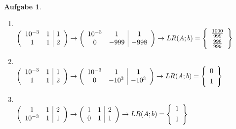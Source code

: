 \documentclass[11pt]{article}
\theoremstyle{break}
\newtheorem{task}{Aufgabe}
\begin{document}
\begin{task}
    \hfill\vspace{-5mm}
    \begin{enumerate}[label={(\alph*)}]
        \item \hfill\vspace{-5mm}\\
        $\left(\begin{array}{cc|c}
            10^{-3} & 1 & 1\\
            1 & 1 & 2
        \end{array}\right)
        \rightarrow\left(\begin{array}{cc|c}
            10^{-3} & 1 & 1\\
            0 & -999 & -998
        \end{array}\right)
        \rightarrow LR(A;b)=\left\{\begin{array}{c}
            \frac{1000}{999}\vspace{1mm}\\
            \frac{998}{999}
        \end{array}\right\}$

        \item \hfill\vspace{-5mm}\\
        $\left(\begin{array}{cc|c}
            10^{-3} & 1 & 1\\
            1 & 1 & 2
        \end{array}\right)
        \rightarrow\left(\begin{array}{cc|c}
            10^{-3} & 1 & 1\\
            0 & -10^3 & -10^3
        \end{array}\right)
        \rightarrow LR(A;b)=\left\{\begin{array}{c}
            0\vspace{1mm}\\
            1
        \end{array}\right\}$

        \item \hfill\vspace{-5mm}\\
        $\left(\begin{array}{cc|c}
            1 & 1 & 2\\
            10^{-3} & 1 & 1
        \end{array}\right)
        \rightarrow\left(\begin{array}{cc|c}
            1 & 1 & 2\\
            0 & 1 & 1
        \end{array}\right)
        \rightarrow LR(A;b)=\left\{\begin{array}{c}
            1\vspace{1mm}\\
            1
        \end{array}\right\}$


\end{enumerate}
\end{task}
\end{document}
